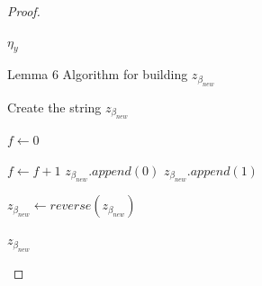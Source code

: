\documentclass[runningheads]{llncs}
\begin{document}
\begin{proof}
\begin{algorithm}[H]
\begin{algorithmic}[1]
            \Return $\eta_{y}$
            \EndFunction
        \end{algorithmic}
    \end{algorithm}

    \begin{algorithm}[H]
        \caption{Lemma 6 Algorithm for building $z_{\beta_{new}}$}\label{lemma6z}
        \begin{algorithmic}[1]
        
                \State Create the string $z_{\beta_{new}}$
            \EndIf
            
            \State $f\gets 0$

                    \State $f\gets f+1$
                    \State $z_{\beta_{new}}.append(0)$
                \EndWhile
                \State $z_{\beta_{new}}.append(1)$
            \EndFor
            
            \State $z_{\beta_{new}}\gets reverse(z_{\beta_{new}})$


            \Return $z_{\beta_{new}}$
            \EndFunction
        \end{algorithmic}
    \end{algorithm}





\end{proof}
\end{document}
